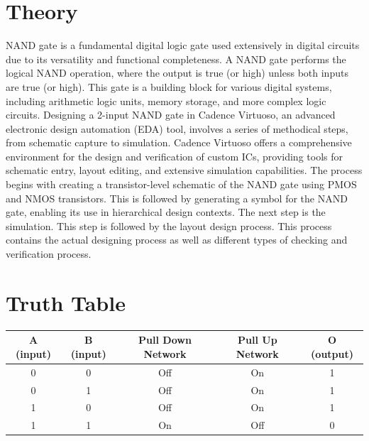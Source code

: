 \documentclass[11pt]{article}
\begin{document}
\section{Theory}
NAND gate is a fundamental digital logic gate used extensively in digital
circuits due to its versatility and functional completeness. A NAND gate
performs the logical NAND operation, where the output is true (or high)
unless both inputs are true (or high). This gate is a building block for
various digital systems, including arithmetic logic units, memory storage,
and more complex logic circuits. Designing a 2-input NAND gate in Cadence Virtuoso, an advanced electronic design automation (EDA) tool,
involves a series of methodical steps, from schematic capture to simulation.
Cadence Virtuoso offers a comprehensive environment for the design and
verification of custom ICs, providing tools for schematic entry, layout
editing, and extensive simulation capabilities. The process begins with
creating a transistor-level schematic of the NAND gate using PMOS and
NMOS transistors. This is followed by generating a symbol for the NAND
gate, enabling its use in hierarchical design contexts. The next step is the
simulation. This step is followed by the layout design process. This process contains the actual designing process as well as different types of checking and verification process.
\newpage
\section{Truth Table}
\begin{center}
    \begin{tabular}{|c|c|c|c|c|}
        \hline
        \hline
        A (input) & B (input) & Pull Down Network & Pull Up Network & O (output) \\
        \hline
        \hline
        0         & 0         & Off               & On              & 1          \\
        \hline
        0         & 1         & Off               & On              & 1          \\
        \hline
        1         & 0         & Off               & On              & 1          \\
        \hline
        1         & 1         & On                & Off             & 0          \\
        \hline
    \end{tabular}
\end{center}
\end{document}
